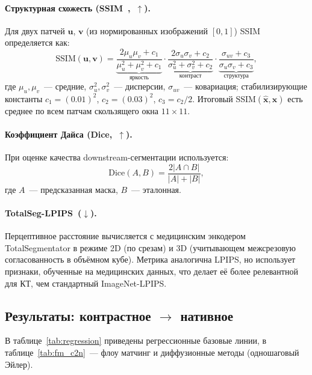 \paragraph{Структурная схожесть (SSIM~\cite{1284395},~$\uparrow$).}
Для двух патчей $\mathbf{u}$, $\mathbf{v}$ (из нормированных изображений $[0,1]$) SSIM определяется как:
\begin{equation}
    \mathrm{SSIM}(\mathbf{u}, \mathbf{v}) =
    \underbrace{\frac{2\mu_u\mu_v + c_1}{\mu_u^2 + \mu_v^2 + c_1}}_{\text{яркость}}
    \cdot
    \underbrace{\frac{2\sigma_u\sigma_v + c_2}{\sigma_u^2 + \sigma_v^2 + c_2}}_{\text{контраст}}
    \cdot
    \underbrace{\frac{\sigma_{uv} + c_3}{\sigma_u\sigma_v + c_3}}_{\text{структура}},
    \label{eq:ssim}
\end{equation}
где $\mu_u, \mu_v$~--- средние, $\sigma_u^2, \sigma_v^2$~--- дисперсии, $\sigma_{uv}$~--- ковариация; стабилизирующие константы $c_1 = (0.01)^2$, $c_2 = (0.03)^2$, $c_3 = c_2/2$. Итоговый $\mathrm{SSIM}(\hat{\mathbf{x}}, \mathbf{x})$ есть среднее по всем патчам скользящего окна $11\times11$.

\paragraph{Коэффициент Дайса (Dice,~$\uparrow$).}
При оценке качества downstream-сегментации используется:
\begin{equation}
    \mathrm{Dice}(A, B) = \frac{2|A \cap B|}{|A| + |B|},
    \label{eq:dice}
\end{equation}
где $A$~--- предсказанная маска, $B$~--- эталонная.

\paragraph{TotalSeg-LPIPS~($\downarrow$).}
Перцептивное расстояние вычисляется с медицинским энкодером TotalSegmentator в режиме 2D (по срезам) и 3D (учитывающем межсрезовую согласованность в объёмном кубе). Метрика аналогична LPIPS, но использует признаки, обученные на медицинских данных, что делает её более релевантной для КТ, чем стандартный ImageNet-LPIPS.

\subsection{Результаты: контрастное $\to$ нативное}
\label{sec:quant_c2n}

В таблице~\ref{tab:regression} приведены регрессионные базовые линии, в таблице~\ref{tab:fm_c2n}~--- флоу матчинг и диффузионные методы (одношаговый Эйлер).

